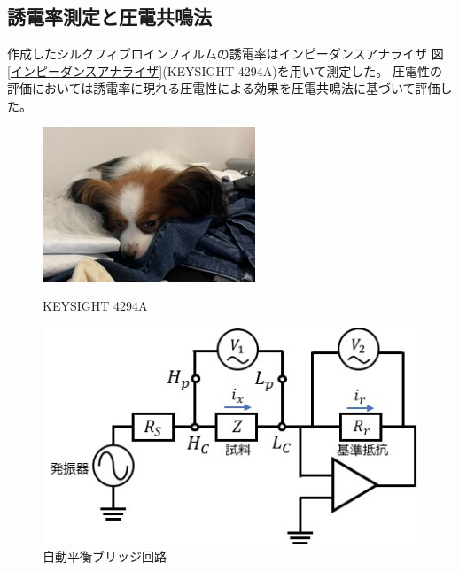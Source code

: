 \documentclass[dvipdfmx,12pt,a4paper]{jreport}
\begin{document}
			\subsection{誘電率測定と圧電共鳴法}
			作成したシルクフィブロインフィルムの誘電率はインピーダンスアナライザ
			図\ref{インピーダンスアナライザ}(KEYSIGHT 4294A)を用いて測定した。
			圧電性の評価においては誘電率に現れる圧電性による効果を圧電共鳴法に基づいて評価した。
			\begin{figure}[h]
				\centering
				\begin{minipage}{0.45\hsize}
					\centering
					\includegraphics{sora.jpg}
					\caption{KEYSIGHT 4294A}
					\label{インピーダンスアナライザ}
				\end{minipage}
				\begin{minipage}{0.45\hsize}
					\centering
					\includegraphics{自動平衡ブリッジ回路.jpg}
					\caption{自動平衡ブリッジ回路}
					\label{自動平衡ブリッジ回路}
				\end{minipage}
			\end{figure}
\end{document}
